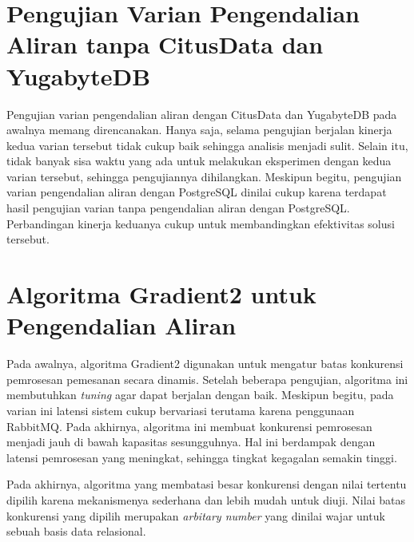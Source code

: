 \section{Pengujian Varian Pengendalian Aliran tanpa CitusData dan YugabyteDB}

Pengujian varian pengendalian aliran dengan CitusData dan YugabyteDB pada awalnya memang direncanakan. Hanya saja, selama pengujian berjalan kinerja kedua varian tersebut tidak cukup baik sehingga analisis menjadi sulit. Selain itu, tidak banyak sisa waktu yang ada untuk melakukan eksperimen dengan kedua varian tersebut, sehingga pengujiannya dihilangkan. Meskipun begitu, pengujian varian pengendalian aliran dengan PostgreSQL dinilai cukup karena terdapat hasil pengujian varian tanpa pengendalian aliran dengan PostgreSQL. Perbandingan kinerja keduanya cukup untuk membandingkan efektivitas solusi tersebut.

\section{Algoritma Gradient2 untuk Pengendalian Aliran}

Pada awalnya, algoritma Gradient2 digunakan untuk mengatur batas konkurensi pemrosesan pemesanan secara dinamis. Setelah beberapa pengujian, algoritma ini membutuhkan \textit{tuning} agar dapat berjalan dengan baik. Meskipun begitu, pada varian ini latensi sistem cukup bervariasi terutama karena penggunaan RabbitMQ. Pada akhirnya, algoritma ini membuat konkurensi pemrosesan menjadi jauh di bawah kapasitas sesungguhnya. Hal ini berdampak dengan latensi pemrosesan yang meningkat, sehingga tingkat kegagalan semakin tinggi.

Pada akhirnya, algoritma yang membatasi besar konkurensi dengan nilai tertentu dipilih karena mekanismenya sederhana dan lebih mudah untuk diuji. Nilai batas konkurensi yang dipilih merupakan \textit{arbitary number} yang dinilai wajar untuk sebuah basis data relasional.
 